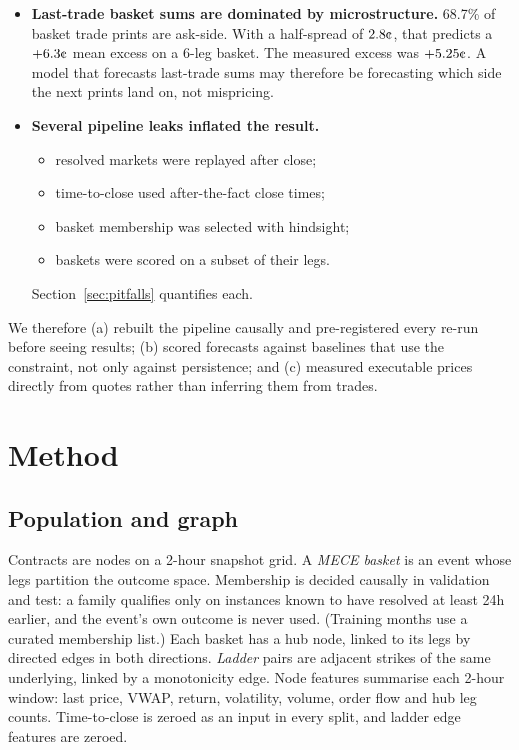 \documentclass[11pt,a4paper]{article}
\newcommand{\cent}{\text{\textcent}}
\begin{document}
\begin{itemize}
  \item \textbf{Last-trade basket sums are dominated by microstructure.} 68.7\% of
    basket trade prints are ask-side. With a half-spread of $2.8\cent$, that
    predicts a $+6.3\cent$ mean excess on a 6-leg basket. The measured excess was
    $+5.25\cent$. A model that forecasts last-trade sums may therefore be
    forecasting which side the next prints land on, not mispricing.
  \item \textbf{Several pipeline leaks inflated the result.}
    \begin{itemize}
      \item resolved markets were replayed after close;
      \item time-to-close used after-the-fact close times;
      \item basket membership was selected with hindsight;
      \item baskets were scored on a subset of their legs.
    \end{itemize}
    Section~\ref{sec:pitfalls} quantifies each.
\end{itemize}

We therefore (a) rebuilt the pipeline causally and pre-registered every re-run
before seeing results; (b) scored forecasts against baselines that use the
constraint, not only against persistence; and (c) measured executable prices
directly from quotes rather than inferring them from trades.

\section{Method}

\subsection{Population and graph}
Contracts are nodes on a 2-hour snapshot grid. A \emph{MECE basket} is an event
whose legs partition the outcome space. Membership is decided causally in
validation and test: a family qualifies only on instances known to have resolved
at least 24h earlier, and the event's own outcome is never used. (Training months
use a curated membership list.) Each basket has
a hub node, linked to its legs by directed edges in both directions. \emph{Ladder}
pairs are adjacent strikes of the same underlying, linked by a monotonicity edge.
Node features summarise each 2-hour window: last price, VWAP, return, volatility,
volume, order flow and hub leg counts. Time-to-close is zeroed as an input in
every split, and ladder edge features are zeroed.
\end{document}
